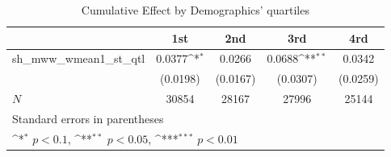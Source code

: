 \begin{table}[htbp]\centering
\def\sym#1{\ifmmode^{#1}\else\(^{#1}\)\fi}
\caption{Cumulative Effect by Demographics' quartiles}
\begin{tabular}{l*{4}{c}}
\hline\hline
            &\multicolumn{1}{c}{1st}&\multicolumn{1}{c}{2nd}&\multicolumn{1}{c}{3rd}&\multicolumn{1}{c}{4rd}\\
\hline
sh\_mww\_wmean1\_st\_qtl&      0.0377\sym{*}  &      0.0266         &      0.0688\sym{**} &      0.0342         \\
            &    (0.0198)         &    (0.0167)         &    (0.0307)         &    (0.0259)         \\
\hline
\(N\)       &       30854         &       28167         &       27996         &       25144         \\
\hline\hline
\multicolumn{5}{l}{\footnotesize Standard errors in parentheses}\\
\multicolumn{5}{l}{\footnotesize \sym{*} \(p<0.1\), \sym{**} \(p<0.05\), \sym{***} \(p<0.01\)}\\
\end{tabular}
\end{table}
